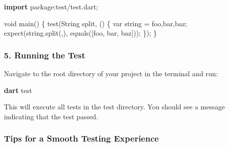 \documentclass[
]{article}
\newenvironment{Shaded}{\begin{snugshade}}{\end{snugshade}}
\newcommand{\DataTypeTok}[1]{\textcolor[rgb]{0.16,0.50,0.73}{#1}}
\newcommand{\ExtensionTok}[1]{\textcolor[rgb]{0.00,0.60,1.00}{\textbf{#1}}}
\newcommand{\KeywordTok}[1]{\textcolor[rgb]{0.81,0.81,0.76}{\textbf{#1}}}
\newcommand{\NormalTok}[1]{\textcolor[rgb]{0.81,0.81,0.76}{#1}}
\newcommand{\OperatorTok}[1]{\textcolor[rgb]{0.81,0.81,0.76}{#1}}
\newcommand{\StringTok}[1]{\textcolor[rgb]{0.96,0.31,0.31}{#1}}
\begin{document}
\begin{Shaded}
\begin{Highlighting}[]
\KeywordTok{import} \StringTok{\textquotesingle{}package:test/test.dart\textquotesingle{}}\NormalTok{;}

\DataTypeTok{void}\NormalTok{ main() }\OperatorTok{\{}
\NormalTok{  test(}\StringTok{\textquotesingle{}String split\textquotesingle{}}\OperatorTok{,}\NormalTok{ () }\OperatorTok{\{}
    \DataTypeTok{var}\NormalTok{ string }\OperatorTok{=} \StringTok{\textquotesingle{}foo,bar,baz\textquotesingle{}}\NormalTok{;}
\NormalTok{    expect(string}\OperatorTok{.}\NormalTok{split(}\StringTok{\textquotesingle{},\textquotesingle{}}\NormalTok{)}\OperatorTok{,}\NormalTok{ equals([}\StringTok{\textquotesingle{}foo\textquotesingle{}}\OperatorTok{,} \StringTok{\textquotesingle{}bar\textquotesingle{}}\OperatorTok{,} \StringTok{\textquotesingle{}baz\textquotesingle{}}\NormalTok{]));}
  \OperatorTok{\}}\NormalTok{);}
\OperatorTok{\}}
\end{Highlighting}
\end{Shaded}

\subsubsection{5. Running the Test}\label{running-the-test}

Navigate to the root directory of your project in the terminal and run:

\begin{Shaded}
\begin{Highlighting}[]
\ExtensionTok{dart}\NormalTok{ test}
\end{Highlighting}
\end{Shaded}

This will execute all tests in the test directory. You should see a
message indicating that the test passed.

\subsubsection{Tips for a Smooth Testing
Experience}\label{tips-for-a-smooth-testing-experience}
\end{document}
